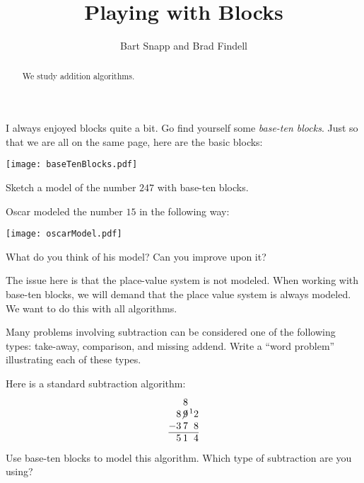 \documentclass[nooutcomes]{ximera}
\title{Playing with Blocks}
\author{Bart Snapp and Brad Findell}
\begin{document}
\begin{abstract}
  We study addition algorithms.
\end{abstract}
\maketitle

\label{A:B1}

I always enjoyed blocks quite a bit. Go find yourself
some \textit{base-ten blocks}. Just so that we are all on the same
page, here are the basic blocks:
\begin{image}
\texttt{[image: baseTenBlocks.pdf]}
\end{image}

\begin{problem} 
Sketch a model of the number $247$ with base-ten blocks.
\vspace{0.8in}
\end{problem}

\begin{problem}
Oscar modeled the number $15$ in the following way:
\begin{image}
\texttt{[image: oscarModel.pdf]}
\end{image}
What do you think of his model?  Can you improve upon it?  
\vspace{0.5in}
\end{problem}

\begin{teachingnote}
The issue here is that the place-value system is not modeled. When
working with base-ten blocks, we will demand that the place value
system is always modeled.  We want to do this with all algorithms.
\end{teachingnote}

\begin{problem}
Many problems involving subtraction can be considered one of the
following types: take-away, comparison, and missing addend.  Write a
``word problem'' illustrating each of these types.
\end{problem}

\begin{problem} 
Here is a standard subtraction algorithm:
\[
\normalfont
\begin{tabular}{@{}r@{}r@{}r@{}r@{}}
&   & 8 &  \\
& 8 & $\not{\hspace{-.2ex}9}$ & $\hspace{.3ex}\leftexp{1}2$\\
$-$ & 3 & 7 & 8\\ \hline
& 5 & 1 & 4
\end{tabular}
\]
Use base-ten blocks to model this algorithm.  Which type of subtraction are you using?  
\end{problem}
\end{document}
